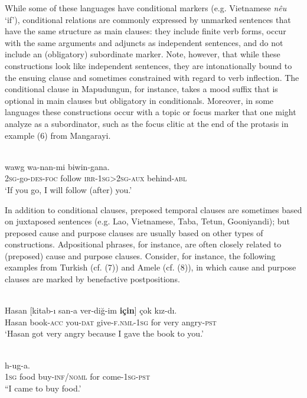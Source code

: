 \documentclass[output=paper]{langsci/langscibook}
\begin{document}
While some of these languages have conditional markers (e.g. Vietnamese \textit{nêu} ‘if’), conditional relations are commonly expressed by unmarked sentences that have the same structure as main clauses: they include finite verb forms, occur with the same arguments and adjuncts as independent sentences, and do not include an (obligatory) subordinate marker. Note, however, that while these constructions look like independent sentences, they are intonationally bound to the ensuing clause and sometimes constrained with regard to verb inflection. The conditional clause in Mapudungun, for instance, takes a mood suffix that is optional in main clauses but obligatory in conditionals. Moreover, in some languages these constructions occur with a topic or focus marker that one might analyze as a subordinator, such as the focus clitic at the end of the protasis in example (6) from Mangarayi.

\ea\label{ex:key:}
\\
\gll   [Na-yang-gu=\textbf{bayi}]   wawg   wa-nan-mi  biwin-gana.\\
       \textsc{2sg}-go-\textsc{des-foc}    follow   \textsc{irr-1sg>2sg-aux}  behind-\textsc{abl}\\
\glt   `If you go, I will follow (after) you.'
\z

In addition to conditional clauses, preposed temporal clauses are sometimes based on juxtaposed sentences (e.g. Lao, Vietnamese, Taba, Tetun, Gooniyandi); but preposed cause and purpose clauses are usually based on other types of constructions. Adpositional phrases, for instance, are often closely related to (preposed) cause and purpose clauses. Consider, for instance, the following examples from Turkish (cf. (7)) and Amele (cf. (8)), in which cause and purpose clauses are marked by benefactive postpositions. 

\ea\label{ex:key:}
\\
\gll   Hasan   [kitab-ı  san-a  ver-diğ-im  \textbf{için}]  çok  kız-dı.\\
       Hasan  book-\textsc{acc}  you-\textsc{dat}  give-\textsc{f.nml-1sg}  for  very  angry-\textsc{pst}  \\
\glt   `Hasan got very angry because I gave the book to you.'
\z

\ea\label{ex:key:}
\\
  h-ug-a.\\
       \textsc{1sg}   food   buy-\textsc{inf/noml}  for  come-\textsc{1sg-pst}\\
\glt   \textsc{“}I came to buy food.'
\z
\end{document}
